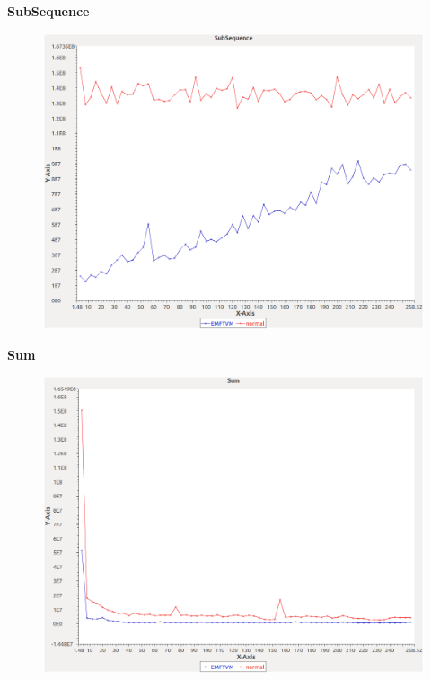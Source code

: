 \noindent\textbf{SubSequence}

\begin{figure}[h]
\centering
\includegraphics[width=\textwidth]{../graphs/sequence/SubSequence}
\end{figure}
\pagebreak

\noindent\textbf{Sum}

\begin{figure}[h]
\centering
\includegraphics[width=\textwidth]{../graphs/sequence/Sum}
\end{figure}
\pagebreak

